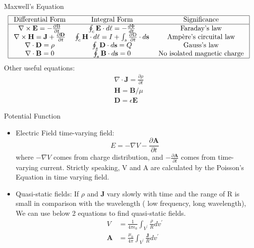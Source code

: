 \documentclass[xcolor={dvipsnames}]{beamer}
\begin{document}
\begin{frame}{Maxwell’s Equation}
\[
\begin{array}{|ccc|}
\hline \text { Differential Form } & \text { Integral Form } & \text { Significance } \\
\hline \nabla \times \mathbf{E}=-\frac{\partial \mathrm{B}}{\partial t} & \oint_{c} \mathbf{E} \cdot d \ell=-\frac{d \Phi}{d t} & \text { Faraday's law } \\
\nabla \times \mathbf{H}=\mathbf{J}+\frac{\partial \mathbf{D}}{\partial t} & \oint_{c} \mathbf{H} \cdot d \ell=I+\int_{s} \frac{\partial \mathrm{D}}{\partial t} \cdot d \mathbf{s} & \text { Ampère's circuital law } \\
\nabla \cdot \mathbf{D}=\rho & \oint_{s} \mathbf{D} \cdot d \mathbf{s}=Q & \text { Gauss's law } \\
\nabla \cdot \mathbf{B}=0 & \oint_{s} \mathbf{B} \cdot d \mathbf{s}=0 & \text { No isolated magnetic charge } \\
\hline
\end{array}
\]
Other useful equations:
\[
\begin{array}{c}
\nabla \cdot \mathbf{J}=\frac{\partial \rho}{\partial t} \\
\mathbf{H}=\mathbf{B} / \mu \\
\mathbf{D}=\epsilon \mathbf{E}
\end{array}
\]

\end{frame}
\begin{frame}{Potential Function}
\begin{itemize}
\item Electric Field time-varying field:
$$E=-\nabla V-\frac{\partial \mathbf{A}}{\partial t}$$
where  $-\nabla V $ comes from charge distribution, and  $-\frac{\partial \mathbf{A}}{\partial t}$  comes from time-varying current. Strictly speaking,  $\mathrm{V}$  and $ \mathrm{A} $ are calculated by the Poisson's Equation in time varying field.
\item Quasi-static fields: If  $\rho$  and  $\mathbf{J}$  vary slowly with time and the range of  $\mathrm{R}$  is small in comparison with the wavelength ( low frequency, long wavelength), We can use below 2 equations to find quasi-static fields.
\[
\begin{aligned}
V &=\frac{1}{4 \pi \epsilon_{0}} \int_{V^{\prime}} \frac{\rho}{R} d v^{\prime} \\
\mathbf{A} &=\frac{\mu_{0}}{4 \pi} \int_{V^{\prime}} \frac{\mathbf{J}}{R} d v^{\prime}
\end{aligned}
\]
\end{itemize}
\end{frame}
\end{document}
